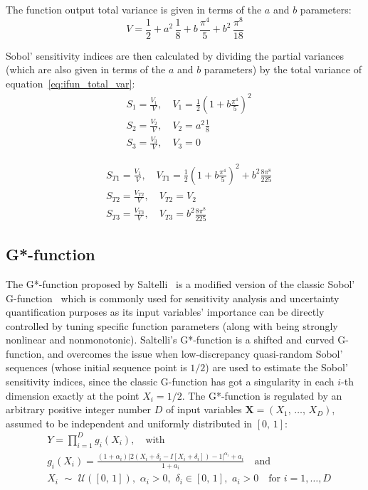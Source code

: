 \vspace{0.2cm}\noindent
The function output total variance is given in terms of the $a$ and $b$ parameters:
%
\begin{equation}\label{eq:ifun_total_var}
	V = \frac{1}{2} + a^2\,\frac{1}{8} + b\,\frac{\pi^4}{5} + b^2\,\frac{\pi^8}{18}
\end{equation}

\vspace{0.2cm}\noindent
Sobol' sensitivity indices are then calculated by dividing the partial variances (which are also given in terms of the $a$ and $b$ parameters) by the total variance of equation~\eqref{eq:ifun_total_var}:
%
\begin{align}
	& S_{1} = \frac{V_{1}}{V},\quad V_{1} = \frac{1}{2}\left(1 + b\frac{\pi^4}{5}\right)^2 \\
	& S_{2} = \frac{V_{2}}{V},\quad V_{2} = a^2\frac{1}{8} \\
	& S_{3} = \frac{V_{3}}{V},\quad V_{3} = 0
\end{align}

\begin{align}
	& S_{T1} = \frac{V_{1}}{V},\quad V_{T1} = \frac{1}{2}\left(1 + b\frac{\pi^4}{5}\right)^2 + b^2\frac{8\pi^8}{225} \\
	& S_{T2} = \frac{V_{T2}}{V},\quad V_{T2} = V_2 \\
	& S_{T3} = \frac{V_{T3}}{V},\quad V_{T3} = b^2\frac{8\pi^8}{225}
\end{align}


%
%
%
\subsection{G*-function}
The G*-function proposed by Saltelli~\cite{Saltelli:2010} is a modified version of the classic Sobol' G-function~\cite{Archer:1997} which is commonly used for sensitivity analysis and uncertainty quantification purposes as its input variables' importance can be directly controlled by tuning specific function parameters (along with being strongly nonlinear and nonmonotonic). Saltelli's G*-function is a shifted and curved G-function, and overcomes the issue when low-discrepancy quasi-random Sobol' sequences (whose initial sequence point is $1/2$) are used to estimate the Sobol' sensitivity indices, since the classic G-function has got a singularity in each $i$-th dimension exactly at the point $X_{i}=1/2$. The G*-function is regulated by an arbitrary positive integer number $D$ of input variables $\mathbf{X}=(X_1,\,\dots,\,X_D)$, assumed to be independent and uniformly distributed in $[0,\,1]$: 
%
\begin{align}\label{eq:gstarfun}
	& Y = \prod_{i=1}^{D}g_i(X_i),\quad\text{with} \\
	& g_i(X_i)=\frac{(1+\alpha_i)\vert 2(X_i+\delta_i-I[X_i+\delta_i])-1\vert^{\alpha_i}+a_i}{1+a_i}\quad\text{and} \\
	& X_i\,\,\sim\,\,\mathcal{U}([0,\,1]),\,\,\alpha_i > 0,\,\,\delta_i\in [0,\,1],\,\,a_i>0\quad\text{for}\,\,i=1,\dots,D
\end{align}

